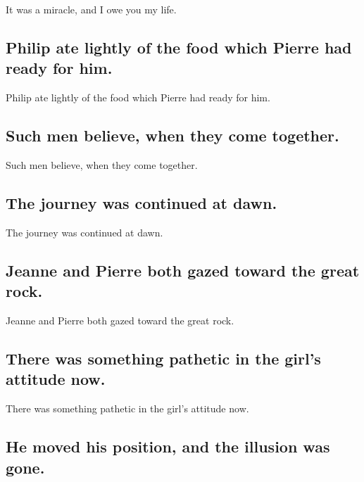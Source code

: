 \documentclass[]{article}
\begin{document}
It was a miracle, and I owe you my life.

\hypertarget{philip-ate-lightly-of-the-food-which-pierre-had-ready-for-him.}{%
\subsection{Philip ate lightly of the food which Pierre had ready for
him.}\label{philip-ate-lightly-of-the-food-which-pierre-had-ready-for-him.}}

Philip ate lightly of the food which Pierre had ready for him.

\hypertarget{such-men-believe-when-they-come-together.}{%
\subsection{Such men believe, when they come
together.}\label{such-men-believe-when-they-come-together.}}

Such men believe, when they come together.

\hypertarget{the-journey-was-continued-at-dawn.}{%
\subsection{The journey was continued at
dawn.}\label{the-journey-was-continued-at-dawn.}}

The journey was continued at dawn.

\hypertarget{jeanne-and-pierre-both-gazed-toward-the-great-rock.}{%
\subsection{Jeanne and Pierre both gazed toward the great
rock.}\label{jeanne-and-pierre-both-gazed-toward-the-great-rock.}}

Jeanne and Pierre both gazed toward the great rock.

\hypertarget{there-was-something-pathetic-in-the-girls-attitude-now.}{%
\subsection{There was something pathetic in the girl's attitude
now.}\label{there-was-something-pathetic-in-the-girls-attitude-now.}}

There was something pathetic in the girl's attitude now.

\hypertarget{he-moved-his-position-and-the-illusion-was-gone.}{%
\subsection{He moved his position, and the illusion was
gone.}\label{he-moved-his-position-and-the-illusion-was-gone.}}
\end{document}
